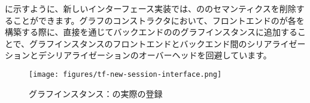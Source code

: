 \begin{content}
に示すように、新しいインターフェース実装では、ののセマンティクスを削除することができます。グラフのコンストラクタにおいて、フロントエンドのが各を構築する際に、直接を通じてバックエンドののグラフインスタンスに追加することで、グラフインスタンスのフロントエンドとバックエンド間のシリアライゼーションとデシリアライゼーションのオーバーヘッドを回避しています。

\begin{figure}[H]
\centering
\texttt{[image: figures/tf-new-session-interface.png]}
\caption{グラフインスタンス：の実際の登録}
 \label{fig:tf-new-session-interface}
\end{figure}

\end{content}
